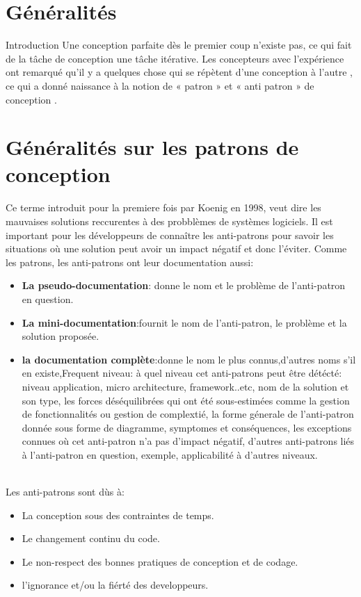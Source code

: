 

\newpage
\section{Généralités}
Introduction
Une conception parfaite dès le premier coup n’existe pas, ce qui fait de la tâche de conception une tâche itérative. Les concepteurs avec l’expérience ont remarqué qu’il y a quelques chose qui se répètent d’une conception à l’autre , ce qui a donné naissance à la notion de « patron » et « anti patron » de conception .
\section{Généralités sur les patrons de conception}
Ce terme introduit pour la premiere fois par Koenig en 1998, veut dire les mauvaises solutions reccurentes à des probblèmes de systèmes logiciels\cite{brown1998antipatterns}. Il est important pour les développeurs de connaître les anti-patrons pour savoir les situations où une solution peut avoir un impact négatif et donc l’éviter.
Comme les patrons, les anti-patrons ont leur documentation aussi\cite{arnaoudova2010defining}:
\begin{itemize}
\item \textbf{La pseudo-documentation}: donne le nom et le problème de l’anti-patron en question.
\item \textbf{La mini-documentation}:fournit le nom de l’anti-patron, le problème et la solution proposée.
\item \textbf{la documentation complète}:donne le nom le plus connus,d’autres noms s’il en existe,Frequent niveau: à quel niveau cet anti-patrons peut être détécté: niveau application, micro architecture, framework..etc, nom de la solution et son type, les forces déséquilibrées qui ont été sous-estimées comme la gestion de fonctionnalités ou gestion de complextié, la forme génerale de l’anti-patron donnée sous forme de diagramme, symptomes et conséquences, les exceptions connues où cet anti-patron n’a pas d’impact négatif, d’autres anti-patrons liés à l’anti-patron en question, exemple, applicabilité à d’autres niveaux.
\end{itemize}
\\
Les anti-patrons sont dùs à:
\begin{itemize}
\item  La conception sous des contraintes de temps.
\item  Le changement continu du code.
\item Le non-respect des bonnes pratiques de conception et de codage.
\item l’ignorance et/ou la fiérté des developpeurs.
\end{itemize}
\\

